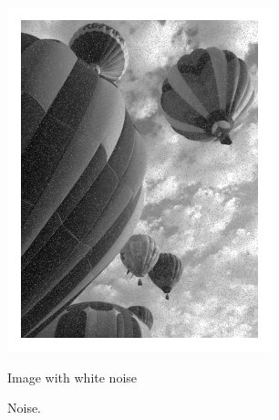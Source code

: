 \begin{figure}
\begin{minipage}[b]{0.47\linewidth}
\includegraphics[width=\textwidth]{figures/balloon_noise.pdf}
\caption*{Image with white noise}
\end{minipage}
\caption{Noise.}
\label{fig:noise_firstattempt}
\end{figure}

